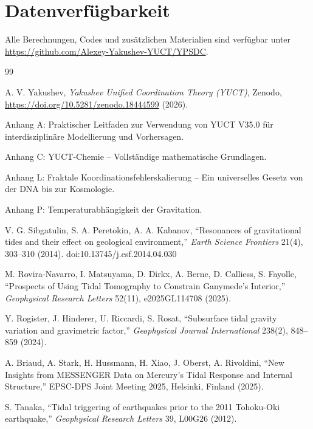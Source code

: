 \documentclass[12pt,a4paper]{article}
\theoremstyle{remark}
\begin{document}
	\section*{Datenverfügbarkeit}
	
	Alle Berechnungen, Codes und zusätzlichen Materialien sind verfügbar unter \url{https://github.com/Alexey-Yakushev-YUCT/YPSDC}.
	
	\begin{thebibliography}{99}
		
		A. V. Yakushev, \emph{Yakushev Unified Coordination Theory (YUCT)}, Zenodo, \url{https://doi.org/10.5281/zenodo.18444599} (2026).
		
		Anhang A: Praktischer Leitfaden zur Verwendung von YUCT V35.0 für interdisziplinäre Modellierung und Vorhersagen.
		
		Anhang C: YUCT-Chemie – Vollständige mathematische Grundlagen.
		
		Anhang L: Fraktale Koordinationsfehlerskalierung – Ein universelles Gesetz von der DNA bis zur Kosmologie.
		
		Anhang P: Temperaturabhängigkeit der Gravitation.
		
		V. G. Sibgatulin, S. A. Peretokin, A. A. Kabanov, ``Resonances of gravitational tides and their effect on geological environment,'' \emph{Earth Science Frontiers} 21(4), 303–310 (2014). doi:10.13745/j.esf.2014.04.030
		
		M. Rovira-Navarro, I. Matsuyama, D. Dirkx, A. Berne, D. Calliess, S. Fayolle, ``Prospects of Using Tidal Tomography to Constrain Ganymede's Interior,'' \emph{Geophysical Research Letters} 52(11), e2025GL114708 (2025).
		
		Y. Rogister, J. Hinderer, U. Riccardi, S. Rosat, ``Subsurface tidal gravity variation and gravimetric factor,'' \emph{Geophysical Journal International} 238(2), 848–859 (2024).
		
		A. Briaud, A. Stark, H. Hussmann, H. Xiao, J. Oberst, A. Rivoldini, ``New Insights from MESSENGER Data on Mercury's Tidal Response and Internal Structure,'' EPSC-DPS Joint Meeting 2025, Helsinki, Finland (2025).
		
		S. Tanaka, ``Tidal triggering of earthquakes prior to the 2011 Tohoku-Oki earthquake,'' \emph{Geophysical Research Letters} 39, L00G26 (2012).
		

\end{thebibliography}
\end{document}
